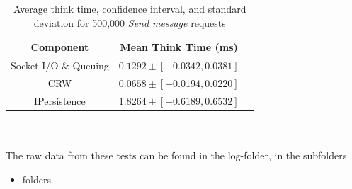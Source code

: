 \documentclass{article}
\begin{document}
                \begin{table}[H]
                    \begin{tabular}{|c|c|c|}
                        \hline 
                        \textbf{Component} & \textbf{Mean Think Time} (ms)\\ 
                        \hline 
                        Socket I/O \& Queuing & $0.1292\pm [-0.0342 , 0.0381]$\\ 
                        \hline 
                        CRW & $0.0658\pm [-0.0194 , 0.0220]$\\ 
                        \hline 
                        IPersistence &$1.8264\pm [-0.6189 , 0.6532]$\\ 
                        \hline 
                    \end{tabular}
                    \caption{Average think time, confidence interval, and standard deviation for 500,000 \textit{Send message} requests}
                    \label{table:thinktime_500k_peek}
                \end{table} 
                ~\\
                \\
                The raw data from these tests can be found in the log-folder, in the subfolders
                \begin{itemize}
                    \item folders
                \end{itemize}
\end{document}
